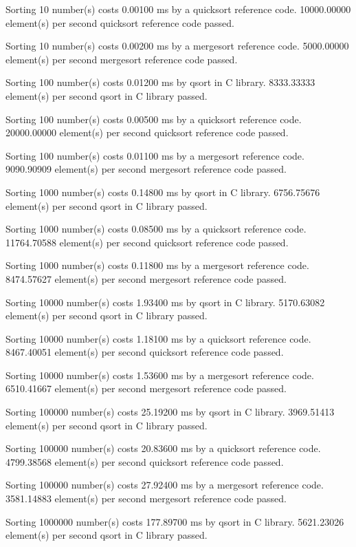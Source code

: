 \documentclass[12pt]{article}
\begin{document}
Sorting 10 number(s) costs 0.00100 ms by a quicksort reference code. 10000.00000 element(s) per second
quicksort reference code passed.

Sorting 10 number(s) costs 0.00200 ms by a mergesort reference code. 5000.00000 element(s) per second
mergesort reference code passed.

Sorting 100 number(s) costs 0.01200 ms by qsort in C library. 8333.33333 element(s) per second
qsort in C library passed.

Sorting 100 number(s) costs 0.00500 ms by a quicksort reference code. 20000.00000 element(s) per second
quicksort reference code passed.

Sorting 100 number(s) costs 0.01100 ms by a mergesort reference code. 9090.90909 element(s) per second
mergesort reference code passed.

Sorting 1000 number(s) costs 0.14800 ms by qsort in C library. 6756.75676 element(s) per second
qsort in C library passed.

Sorting 1000 number(s) costs 0.08500 ms by a quicksort reference code. 11764.70588 element(s) per second
quicksort reference code passed.

Sorting 1000 number(s) costs 0.11800 ms by a mergesort reference code. 8474.57627 element(s) per second
mergesort reference code passed.

Sorting 10000 number(s) costs 1.93400 ms by qsort in C library. 5170.63082 element(s) per second
qsort in C library passed.

Sorting 10000 number(s) costs 1.18100 ms by a quicksort reference code. 8467.40051 element(s) per second
quicksort reference code passed.

Sorting 10000 number(s) costs 1.53600 ms by a mergesort reference code. 6510.41667 element(s) per second
mergesort reference code passed.

Sorting 100000 number(s) costs 25.19200 ms by qsort in C library. 3969.51413 element(s) per second
qsort in C library passed.

Sorting 100000 number(s) costs 20.83600 ms by a quicksort reference code. 4799.38568 element(s) per second
quicksort reference code passed.

Sorting 100000 number(s) costs 27.92400 ms by a mergesort reference code. 3581.14883 element(s) per second
mergesort reference code passed.

Sorting 1000000 number(s) costs 177.89700 ms by qsort in C library. 5621.23026 element(s) per second
qsort in C library passed.
\end{document}
